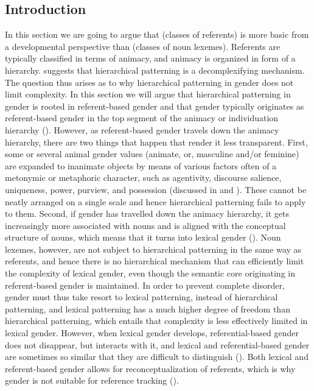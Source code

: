 \documentclass[output=collectionpaper]{langsci/langscibook}
\begin{document}
  \subsection{Introduction}
\label{sec:WDG:3.1}
In this section we are going to argue that  (classes of referents) is more basic from a developmental perspective than  (classes of noun lexemes). Referents are typically classified in terms of animacy, and animacy is organized in form of a hierarchy.  suggests that hierarchical patterning is a decomplexifying mechanism. The question thus arises as to why hierarchical patterning in gender does not limit complexity. In this section we will argue that hierarchical patterning in gender is rooted in referent-based gender and that gender typically originates as referent-based gender in the top segment of the animacy or individuation hierarchy (). However, as referent-based gender travels down the animacy hierarchy, there are two things that happen that render it less transparent. First, some or several animal gender values (animate, or, masculine and/or feminine) are expanded to inanimate objects by means of various factors often of a metonymic or metaphoric character, such as agentivity, discourse salience, uniqueness, power, purview, and possession (discussed in  and ). These cannot be neatly arranged on a single scale and hence hierarchical patterning fails to apply to them. Second, if gender has travelled down the animacy hierarchy, it gets increasingly more associated with nouns and is aligned with the conceptual structure of nouns, which means that it turns into lexical gender (). Noun lexemes, however, are not subject to hierarchical patterning in the same way as referents, and hence there is no hierarchical mechanism that can efficiently limit the complexity of lexical gender, even though the semantic core originating in referent-based gender is maintained. In order to prevent complete disorder, gender must thus take resort to lexical patterning, instead of hierarchical patterning, and lexical patterning has a much higher degree of freedom than hierarchical patterning, which entails that complexity is less effectively limited in lexical gender. However, when lexical gender develops, referential-based gender does not disappear, but interacts with it, and lexical and referential-based gender are sometimes so similar that they are difficult to distinguish (). Both lexical and referent-based gender allows for reconceptualization of referents, which is why gender is not suitable for reference tracking ().
\end{document}

